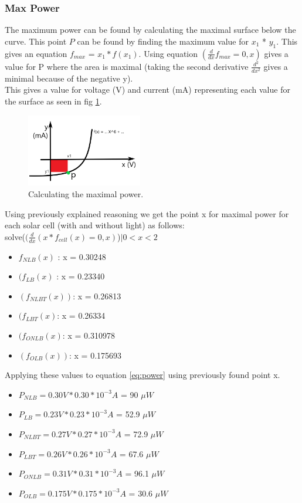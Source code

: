 \documentclass[conference]{IEEEtran}
\begin{document}
\subsubsection{Max Power}
The maximum power can be found by calculating the maximal surface below the curve. This point $P$ can be found by finding the maximum value for $x_1$ * $y_1$. This gives an equation $f_{max}$ = $x_1 * f(x_1)$. Using equation $(\frac{d}{dx} f_{max} = 0 , x)$ gives a value for P where the area is maximal (taking the second derivative $\frac{d^2}{dx^2}$ gives a minimal because of the negative y).\\This gives a value for voltage (V) and current (mA) representing each value for the surface as seen in fig \ref{fig:powercalc}.
\begin{figure}[H]
\centering
\includegraphics[width=0.45\textwidth]{powercalc2.png}
\caption{Calculating the maximal power.}
\label{fig:powercalc} %
\end{figure}
Using previously explained reasoning we get the point x for maximal power for each solar cell (with and without light) as follows:\\
solve($(\frac{d}{dx}(x*f_{cell}(x) = 0,x)$)$|0<x<2$
\begin{itemize}
 \item$f_{NLB}(x)$ : x = 0.30248
 \item$(f_{LB}(x)$ : x = 0.23340
 \item$(f_{NLBT}(x))$: x = 0.26813
 \item$(f_{LBT}(x)$: x = 0.26334
 \item$(f_{ONLB}(x)$: x = 0.310978
 \item$(f_{OLB}(x))$: x = 0.175693
\end{itemize}
Applying these values to equation \ref{eq:power} using previously found point x.
\begin{itemize}
 \item$P_{NLB} = 0.30V * 0.30* 10^{-3} A$ = 90 $\mu W$
 \item$P_{LB} = 0.23V * 0.23* 10^{-3} A$ = 52.9 $\mu W$
 \item$P_{NLBT} = 0.27V * 0.27* 10^{-3} A$ = 72.9 $\mu W$
 \item$P_{LBT} = 0.26V * 0.26* 10^{-3} A$ = 67.6 $\mu W$
 \item$P_{ONLB} = 0.31V * 0.31* 10^{-3} A$ = 96.1 $\mu W$
 \item$P_{OLB} = 0.175V * 0.175* 10^{-3} A$ = 30.6 $\mu W$ 
\end{itemize}
\end{document}
